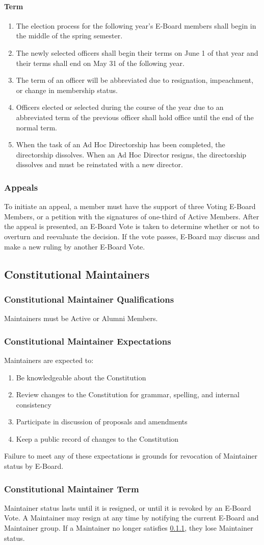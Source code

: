 \documentclass{article}
\newcommand{\asection}[1]{\subsection{#1} \label{#1}}
\newcommand{\asubsection}[1]{\subsubsection{#1} \label{#1}}
\newcommand{\asubsubsection}[1]{\paragraph{#1} \label{#1}}
\begin{document}
\asubsubsection{Term}
\begin{enumerate}
	\item The election process for the following year's E-Board members shall begin in the middle of the spring semester.
	\item The newly selected officers shall begin their terms on June 1 of that year and their terms shall end on May 31 of the following year.
	\item The term of an officer will be abbreviated due to resignation, impeachment, or change in membership status.
	\item Officers elected or selected during the course of the year due to an abbreviated term of the previous officer shall hold office until the end of the normal term.
	\item When the task of an Ad Hoc Directorship has been completed, the directorship dissolves.
	      When an Ad Hoc Director resigns, the directorship dissolves and must be reinstated with a new director.
\end{enumerate}

\asubsection{Appeals}
To initiate an appeal, a member must have the support of three Voting E-Board Members, or a petition with the signatures of one-third of Active Members.
After the appeal is presented, an E-Board Vote is taken to determine whether or not to overturn and reevaluate the decision.
If the vote passes, E-Board may discuss and make a new ruling by another E-Board Vote.

\asection{Constitutional Maintainers}

\asubsection{Constitutional Maintainer Qualifications}
Maintainers must be Active or Alumni Members.

\asubsection{Constitutional Maintainer Expectations}
Maintainers are expected to:
\begin{enumerate}
	\item Be knowledgeable about the Constitution
	\item Review changes to the Constitution for grammar, spelling, and internal consistency
	\item Participate in discussion of proposals and amendments
	\item Keep a public record of changes to the Constitution
\end{enumerate}
Failure to meet any of these expectations is grounds for revocation of Maintainer status by E-Board.

\asubsection{Constitutional Maintainer Term}
Maintainer status lasts until it is resigned, or until it is revoked by an E-Board Vote.
A Maintainer may resign at any time by notifying the current E-Board and Maintainer group.
If a Maintainer no longer satisfies \ref{Constitutional Maintainer Qualifications}, they lose Maintainer status.
\end{document}
